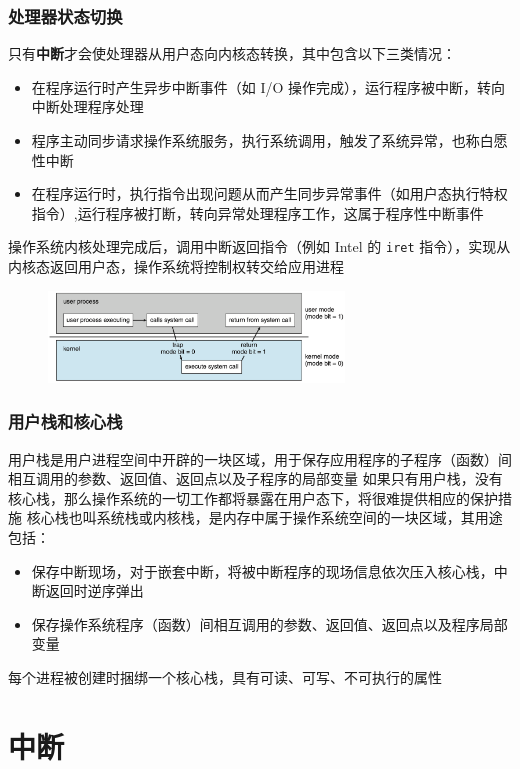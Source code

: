 \documentclass[cs4size,a4paper,10pt]{ctexart}
\begin{document}
	\subsubsection{处理器状态切换}
	只有\textbf{中断}才会使处理器从用户态向内核态转换，其中包含以下三类情况：
	\begin{itemize}
		\item 在程序运行时产生异步中断事件（如 I/O 操作完成），运行程序被中断，转向中断处理程序处理
		\item 程序主动同步请求操作系统服务，执行系统调用，触发了系统异常，也称白愿性中断
		\item 在程序运行时，执行指令出现问题从而产生同步异常事件（如用户态执行特权指令）,运行程序被打断，转向异常处理程序工作，这属于程序性中断事件
	\end{itemize}
	操作系统内核处理完成后，调用中断返回指令（例如 Intel 的 \verb|iret| 指令），实现从内核态返回用户态，操作系统将控制权转交给应用进程
	\begin{figure}[H]
		\centering
		\includegraphics[width=0.7\textwidth]{img/2.1.2.4}
	\end{figure}

	\subsubsection{用户栈和核心栈}
	用户栈是用户进程空间中开辟的一块区域，用于保存应用程序的子程序（函数）间相互调用的参数、返回值、返回点以及子程序的局部变量
	如果只有用户栈，没有核心栈，那么操作系统的一切工作都将暴露在用户态下，将很难提供相应的保护措施
	核心栈也叫系统栈或内核栈，是内存中属于操作系统空间的一块区域，其用途包括：
	\begin{itemize}
		\item 保存中断现场，对于嵌套中断，将被中断程序的现场信息依次压入核心栈，中断返回时逆序弹出
		\item 保存操作系统程序（函数）间相互调用的参数、返回值、返回点以及程序局部变量
	\end{itemize}
	每个进程被创建时捆绑一个核心栈，具有可读、可写、不可执行的属性

	\section{中断}
\end{document}
